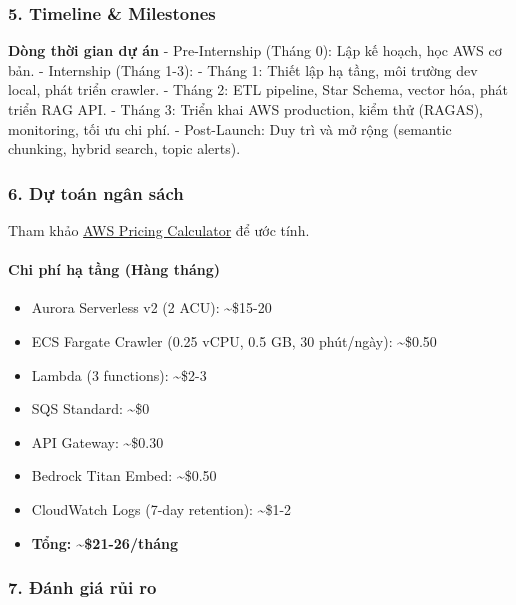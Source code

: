 \hypertarget{timeline-milestones}{%
\subsubsection{5. Timeline \& Milestones}}

\textbf{Dòng thời gian dự án} - Pre-Internship (Tháng 0): Lập kế hoạch,
học AWS cơ bản. - Internship (Tháng 1-3): - Tháng 1: Thiết lập hạ tầng,
môi trường dev local, phát triển crawler. - Tháng 2: ETL pipeline, Star
Schema, vector hóa, phát triển RAG API. - Tháng 3: Triển khai AWS
production, kiểm thử (RAGAS), monitoring, tối ưu chi phí. - Post-Launch:
Duy trì và mở rộng (semantic chunking, hybrid search, topic alerts).

\hypertarget{dux1ef1-touxe1n-nguxe2n-suxe1ch}{%
\subsubsection{6. Dự toán ngân
sách}}

Tham khảo \href{https://calculator.aws/\#/}{AWS Pricing Calculator} để
ước tính.

\hypertarget{chi-phuxed-hux1ea1-tux1ea7ng-huxe0ng-thuxe1ng}{%
\paragraph{Chi phí hạ tầng (Hàng
tháng)}}

\begin{itemize}
\tightlist
\item
  Aurora Serverless v2 (2 ACU): \textasciitilde\$15-20
\item
  ECS Fargate Crawler (0.25 vCPU, 0.5 GB, 30 phút/ngày):
  \textasciitilde\$0.50
\item
  Lambda (3 functions): \textasciitilde\$2-3
\item
  SQS Standard: \textasciitilde\$0
\item
  API Gateway: \textasciitilde\$0.30
\item
  Bedrock Titan Embed: \textasciitilde\$0.50
\item
  CloudWatch Logs (7-day retention): \textasciitilde\$1-2
\item
  \textbf{Tổng: \textasciitilde\$21-26/tháng}
\end{itemize}

\hypertarget{ux111uxe1nh-giuxe1-rux1ee7i-ro}{%
\subsubsection{7. Đánh giá rủi
ro}}

